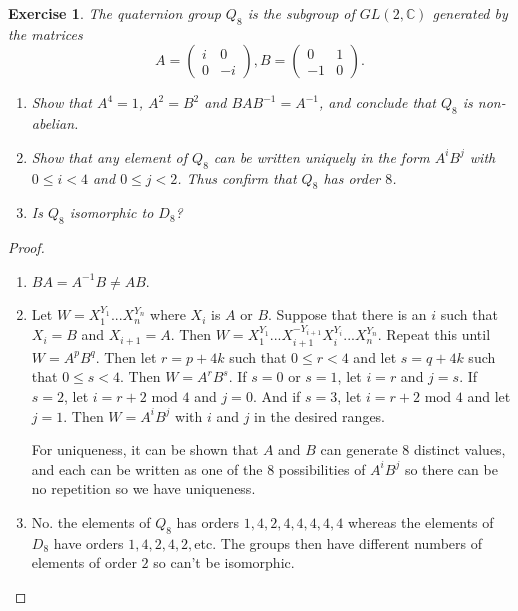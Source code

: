 \documentclass{article}
\newtheorem{exercise}[theorem]{Exercise}
\begin{document}
\begin{exercise}
The quaternion group $Q_8$ is the subgroup of $GL(2,\mathbb{C})$ generated by the matrices\[A=\begin{pmatrix}
  i & 0\\ 
  0 & -i
\end{pmatrix},   B=\begin{pmatrix}
  0 & 1\\ 
  -1 & 0
\end{pmatrix}.\]
\begin{enumerate}[label=(\roman*)]
    \item Show that $A^4=1$, $A^2=B^2$ and $BAB^{-1}=A^{-1}$, and conclude that $Q_8$ is non-abelian.
    \item Show that any element of $Q_8$ can be written uniquely in the form $A^iB^j$ with $0\leq i<4$ and $0\leq j<2$. Thus confirm that $Q_8$ has order $8$.
    \item Is $Q_8$ isomorphic to $D_8$?
\end{enumerate}
\end{exercise}
\begin{proof}
\begin{enumerate}[label=(\roman*)]
    \item $BA=A^{-1}B\neq AB$.
    \item Let $W=X_1^{Y_1}...X_n^{Y_n}$ where $X_i$ is $A$ or $B$. Suppose that there is an $i$ such that $X_i=B$ and $X_{i+1}=A$. Then $W=X_1^{Y_1}...X_{i+1}^{-Y_{i+1}}X_i^{Y_i}...X_n^{Y_n}$. Repeat this until $W=A^pB^q$. Then let $r=p+4k$ such that $0\leq r<4$ and let $s=q+4k$ such that $0\leq s<4$. Then $W=A^rB^s$. If $s=0$ or $s=1$, let $i=r$ and $j=s$. If $s=2$, let $i=r+2\text{ mod }4$ and $j=0$. And if $s=3$, let $i=r+2\text{ mod }4$ and let $j=1$. Then $W=A^iB^j$ with $i$ and $j$ in the desired ranges.

    For uniqueness, it can be shown that $A$ and $B$ can generate $8$ distinct values, and each can be written as one of the $8$ possibilities of $A^iB^j$ so there can be no repetition so we have uniqueness.
    \item No. the elements of $Q_8$ has orders $1,4,2,4,4,4,4,4$ whereas the elements of $D_8$ have orders $1,4,2,4,2,$etc. The groups then have different numbers of elements of order $2$ so can't be isomorphic.
\end{enumerate}
\end{proof}
\end{document}
